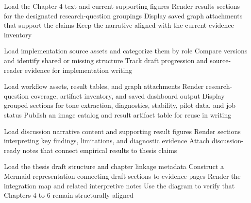 \begin{algorithm}[H]
Load the Chapter 4 text and current supporting figures\;
Render results sections for the designated research-question groupings\;
Display saved graph attachments that support the claims\;
Keep the narrative aligned with the current evidence inventory\;
\caption{Chapter 4 Markdown Results}
\label{alg:chapter4-markdown-results}
\end{algorithm}

\begin{algorithm}[H]
Load implementation source assets and categorize them by role\;
Compare versions and identify shared or missing structure\;
Track draft progression and source-reader evidence for implementation writing\;
\caption{Implementation Documentation and Comparison}
\label{alg:implementation-doc-comparison}
\end{algorithm}

\begin{algorithm}[H]
Load workflow assets, result tables, and graph attachments\;
Render research-question coverage, artifact inventory, and saved dashboard output\;
Display grouped sections for tone extraction, diagnostics, stability, pilot data, and job status\;
Publish an image catalog and result artifact table for reuse in writing\;
\caption{Thesis Workflow Dashboard Suite}
\label{alg:workflow-dashboard-suite}
\end{algorithm}

\begin{algorithm}[H]
Load discussion narrative content and supporting result figures\;
Render sections interpreting key findings, limitations, and diagnostic evidence\;
Attach discussion-ready notes that connect empirical results to thesis claims\;
\caption{Discussion Page Suite}
\label{alg:discussion-page-suite}
\end{algorithm}

\begin{algorithm}[H]
Load the thesis draft structure and chapter linkage metadata\;
Construct a Mermaid representation connecting draft sections to evidence pages\;
Render the integration map and related interpretive notes\;
Use the diagram to verify that Chapters 4 to 6 remain structurally aligned\;
\caption{Chapter 4 to Chapter 6 Integration Mermaid}
\label{alg:chapter4to6-mermaid-integration}
\end{algorithm}

